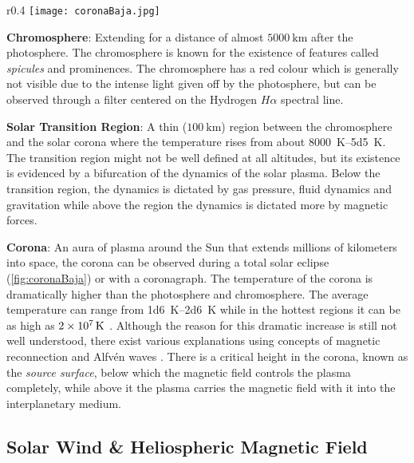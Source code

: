 \begin{wrapfigure}{r}{0.4\textwidth}
    \centering\texttt{[image: coronaBaja.jpg]}
    \caption{
        {\small 
            Sun's corona captured during a solar eclipse. \\ 
            \textit{Source}: Steve Albers, Boulder, CO; Dennis DiCicco, Sky and Telescope; 
            Gary Emerson, E. E. Barnard Observatory
        }
    }
    \label{fig:coronaBaja}
\end{wrapfigure}


\textbf{Chromosphere}: Extending for a distance of almost $\SI{5000}{\kilo\metre}$ after the 
photosphere. The chromosphere is known for the existence of features called \emph{spicules} and 
prominences. The chromosphere has a red colour which is generally not visible due to the intense 
light given off by the photosphere, but can be observed through a filter centered on the Hydrogen 
$H\alpha$ spectral line. %

\textbf{Solar Transition Region}: A thin ($\SI{100}{\kilo\metre}$) region between the chromosphere 
and the solar corona where the temperature rises from about \SIrange{8000}{5d5}{\kelvin}. The 
transition region might not be well defined at all altitudes, but its existence is evidenced by a 
bifurcation of the dynamics of the solar plasma. Below the transition region, the dynamics is 
dictated by gas pressure, fluid dynamics and gravitation while above the region the dynamics is 
dictated more by magnetic forces.

\textbf{Corona}: An aura of plasma around the Sun that extends millions of kilometers into space, 
the corona can be observed during a total solar eclipse (\cref{fig:coronaBaja}) or with a 
coronagraph. The temperature of the corona is dramatically higher than the photosphere and 
chromosphere. The average temperature can range from \SIrange{1d6}{2d6}{\kelvin} while in the 
hottest regions it can be as high as $\SI{2d7}{\kelvin}$ \citep{SolarCorona}. Although the reason 
for this dramatic increase is still not well understood, there exist various explanations using 
concepts of magnetic reconnection \citep{russell2001solar,SolarCorona} and Alfv\'en waves 
\citep{AlfvenCorona}. There is a critical height in the corona, known as the \emph{source surface}, 
below which the magnetic field controls the plasma completely, while above it the plasma carries 
the magnetic field with it into the interplanetary medium.


\subsection{Solar Wind \& Heliospheric Magnetic Field}\label{sec:hmfsolarwind}

